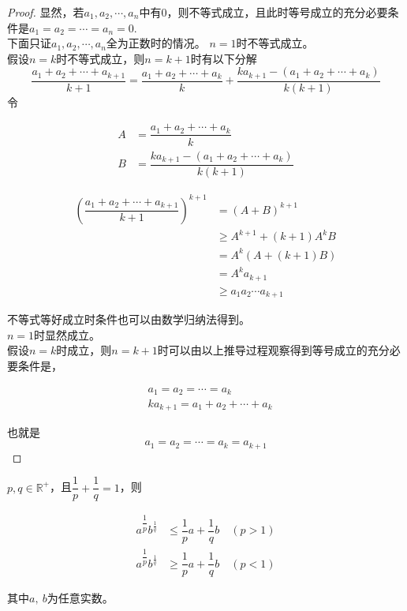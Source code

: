 \begin{proof}
    
    显然，若$a_1,a_2,\cdots,a_n$中有$0$，则不等式成立，且此时等号成立的充分必要条件是$a_1=a_2=\cdots=a_n=0$.\\
    下面只证$a_1,a_2,\cdots,a_n$全为正数时的情况。
    $n=1$时不等式成立。\\
    假设$n=k$时不等式成立，则$n=k+1$时有以下分解
    $$\dfrac{a_1+a_2+\cdots+a_{k+1}}{k+1} = \dfrac{a_1+a_2+\cdots+a_{k}}{k}+ \dfrac{ka_{k+1}-(a_1+a_2+\cdots+a_k)}{k(k+1)}$$
    令
    
    \begin{align*}
        A&=\dfrac{a_1+a_2+\cdots+a_{k}}{k}\\
        B&=\dfrac{ka_{k+1}-(a_1+a_2+\cdots+a_k)}{k(k+1)}
    \end{align*}

    \begin{align*}
        \left(\dfrac{a_1+a_2+\cdots+a_{k+1}}{k+1}\right)^{k+1} &= (A+B)^{k+1}\\
        &\geq A^{k+1} + (k+1) A^k B\\
        &=A^k(A+(k+1)B)\\
        &=A^k a_{k+1}\\
        &\geq a_1 a_2 \cdots a_{k+1}
    \end{align*}

    不等式等好成立时条件也可以由数学归纳法得到。\\
    $n=1$时显然成立。\\
    假设$n=k$时成立，则$n=k+1$时可以由以上推导过程观察得到等号成立的充分必要条件是，

    \begin{align*}
        &a_1=a_2=\cdots=a_k\\
        &ka_{k+1}=a_1+a_2+\cdots+a_k
    \end{align*}

    也就是
    $$a_1=a_2=\cdots=a_k=a_{k+1}$$
\end{proof}

\begin{theorem}[Young不等式]

    $p,q\in\mathbb{R}^+$，且$\dfrac{1}{p}+\dfrac{1}{q}=1$，则

    \begin{align*}
        a^{\dfrac{1}{p}}b^{\frac{1}{q}}&\leq\dfrac{1}{p}a+\dfrac{1}{q}b\quad(p>1)\\
        a^{\dfrac{1}{p}}b^{\frac{1}{q}}&\geq\dfrac{1}{p}a+\dfrac{1}{q}b\quad(p<1)
    \end{align*}

    其中$a,\ b$为任意实数。

\end{theorem}

